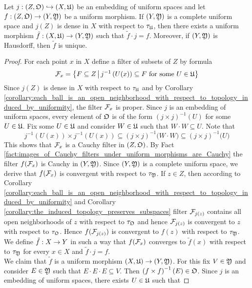 \begin{theorem}\label{theorem:extensions_of_uniform_morphisms_to_complete_spaces}
Let $j:\left(Z,{\mathfrak O} \right) \hookrightarrow \left(X,{\mathfrak U}\right)$ be an embedding of uniform spaces and let $f:\left(Z,{\mathfrak O}\right)\rightarrow \left(Y,{\mathfrak Y}\right)$ be a uniform morphism. If $\left(Y,{\mathfrak Y}\right)$ is a complete uniform space and $j(Z)$ is dense in $X$ with respect to $\tau_{{\mathfrak U}}$, then there exists a uniform morphism $\tilde{f}:\left(X,{\mathfrak U}\right)\rightarrow \left(Y,{\mathfrak Y}\right)$ such that $\tilde{f}\cdot j = f$. Moreover, if $\left(Y,{\mathfrak Y}\right)$ is Hausdorff, then $\tilde{f}$ is unique.
\end{theorem}
\begin{proof}
For each point $x$ in $X$ define a filter of subsets of $Z$ by formula
$${\mathcal F}_x = \big\{F\subseteq Z\,\big|\,j^{-1}\left(U(x)\right)\subseteq F\mbox{ for some }U \in {\mathfrak U}\big\}$$
Since $j(Z)$ is dense in $X$ with respect to $\tau_{{\mathfrak U}}$ and by Corollary \ref{corollary:each_ball_is_an_open_neighborhood_with_respect_to_topology_induced_by_uniformity}, the filter ${\mathcal F}_x$ is proper. Since $j$ is an embedding of uniform spaces, every element of ${\mathfrak O}$ is of the form $\left(j\times j\right)^{-1}(U)$ for some $U \in {\mathfrak U}$. Fix some $U \in {\mathfrak U}$ and consider $W\in {\mathfrak U}$ such that $W\cdot W\subseteq U$. Note that
$$j^{-1}\left(U(x)\right)\times j^{-1}\left(U(x)\right) \subseteq \left(j\times j\right)^{-1}\big(W\cdot W\big) \subseteq \left(j\times j\right)^{-1}\big(U\big)$$
This shows that ${\mathcal F}_x$ is a Cauchy filter in $\left(Z,{\mathfrak O}\right)$. By Fact \ref{fact:images_of_Cauchy_filters_under_uniform_morphisms_are_Cauchy} the filter $f({\mathcal F}_x)$ is Cauchy in $\left(Y,{\mathfrak Y}\right)$. Since $\left(Y,{\mathfrak Y}\right)$ is a complete uniform space, we derive that $f({\mathcal F}_x)$ is convergent with respect to $\tau_{{\mathfrak Y}}$. If $z\in Z$, then according to Corollary \ref{corollary:each_ball_is_an_open_neighborhood_with_respect_to_topology_induced_by_uniformity} and Corollary \ref{corollary:the_induced_topology_preserves_subspaces} filter ${\mathcal F}_{j(z)}$ contains all open neighborhoods of $z$ with respect to $\tau_{{\mathfrak O}}$ and hence ${\mathcal F}_{j(z)}$ is convergent to $z$ with respect to $\tau_{{\mathfrak O}}$. Hence $f({\mathcal F}_{j(z)})$ is convergent to $f(z)$ with respect to $\tau_{{\mathfrak Y}}$. We define $\tilde{f}:X\rightarrow Y$ in such a way that $f({\mathcal F}_x)$ converges to $\tilde{f}(x)$ with respect to $\tau_{{\mathfrak Y}}$ for every $x\in X$ and $\tilde{f} \cdot j = f$.\\
We claim that $\tilde{f}$ is a uniform morphism $\left(X,{\mathfrak U}\right)\rightarrow \left(Y,{\mathfrak Y}\right)$. For this fix $V \in {\mathfrak Y}$ and consider $E \in {\mathfrak Y}$ such that $E\cdot E\cdot E\subseteq V$. Then $\left(f\times f\right)^{-1}(E) \in {\mathfrak O}$. Since $j$ is an embedding of uniform spaces, there exists $U \in {\mathfrak U}$ such that 

\end{proof}

